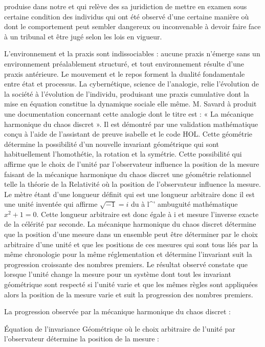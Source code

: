 \documentclass[12pt,letterpaper,oneside]{article}
\begin{document}
produise dans notre et qui relève des sa juridiction de mettre en examen sous certaine condition des individus qui ont été observé d’une certaine manière où dont le comportement peut sembler dangereux ou inconvenable à devoir faire face à un tribunal et être jugé selon les lois en vigueur.

L’environnement et la praxis sont indissociables : aucune praxis n’émerge sans un environnement préalablement structuré, et tout environnement résulte d’une praxis antérieure. Le mouvement et le repos forment la dualité fondamentale entre état et processus. La cybernétique, science de l’analogie, relie l’évolution de la société à l’évolution de l’individu, produisant une praxis cumulative dont la mise en équation constitue la dynamique sociale elle même. M. Savard à produit une documentation concernant cette analogie dont le titre est : «  La mécanique harmonique du chaos discret ». Il est démontré par une validation mathématique conçu à l’aide de l’assistant de preuve isabelle et le code HOL. Cette géométrie détermine la possibilité d’un nouvelle invariant géométrique qui sont habituellement l’homothétie, la rotation et la symétrie. Cette possibilité qui affirme que le choix de l’unité par l’observateur influence la position de la mesure faisant de la mécanique harmonique du chaos discret une géométrie relationnel telle la théorie de la Relativité où la position de l’observateur influence la mesure.  Le mètre étant d’une longueur définit qui est une longueur arbitraire donc il est une unité inventée qui affirme $\sqrt{-1}=i$ du à l\textasciicircum{}' ambuguité mathématique $x^2+1=0$. Cette longueur arbitraire est donc égale à i et mesure l’inverse exacte de la célérité par seconde. La mécanique harmonique du chaos discret détermine que la position d’une mesure dans un ensemble peut être déterminer par le choix arbitraire d’une unité et que les positions de ces mesures qui sont tous liés par la même chronologie pour la même réglementation et détermine l’invariant suit  la progression croissante des nombres premiers. Le résultat observé constate que lorsque l’unité change la mesure pour un système dont tout les invariant géométrique sont respecté si l’unité varie et que les mêmes règles sont appliquées alors la position de la mesure varie et suit la progression des nombres premiers.

La progression observée par la mécanique harmonique du chaos discret :

Équation de l’invariance Géométrique où le choix arbitraire de l’unité par l’observateur détermine la position de la mesure :
\end{document}
